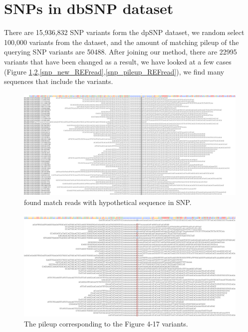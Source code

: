 \section{SNPs in dbSNP dataset}

There are 15,936,832 SNP variants form the dpSNP dataset, we random select 100,000 variants from the dataset, and the amount of matching pileup of the querying SNP variants are 50488. After joining our method, there are 22995 variants that have been changed as a result, we have looked at a few cases (Figure \ref{snp_new_ALTread},\ref{snp_pileup_ALTread},\ref{snp_new_REFread},\ref{snp_pileup_REFread}), we find many sequences that include the variants.


\begin{figure}[H]
\centering
\includegraphics[width=1\columnwidth]{body/image/snp_new_ALTread.png}
\caption[SNP match reads]{ found match reads with hypothetical sequence in SNP.}
\label{snp_new_ALTread}
\end{figure}

\begin{figure}[H]
\centering
\includegraphics[width=1\columnwidth]{body/image/snp_pileup_ALTread.png}
\caption[Figure 4.17 pileup]{ The pileup corresponding to the Figure 4-17 variants.}
\label{snp_pileup_ALTread}
\end{figure}

